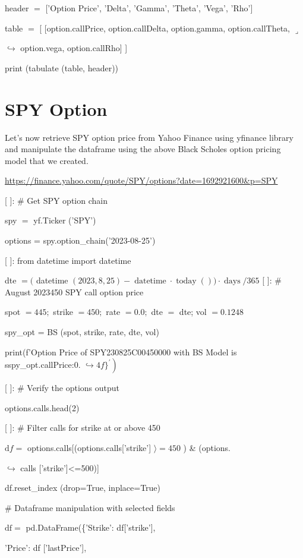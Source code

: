 \documentclass[10pt]{article}
\begin{document}
header $=$ ['Option Price', 'Delta', 'Gamma', 'Theta', 'Vega', 'Rho']

table $=$ [ [option.callPrice, option.callDelta, option.gamma, option.callTheta, $\lrcorner$

$\hookrightarrow$ option.vega, option.callRho] ]

print (tabulate (table, header))

\section*{SPY Option}
Let's now retrieve SPY option price from Yahoo Finance using yfinance library and manipulate the dataframe using the above Black Scholes option pricing model that we created.

\href{https://finance.yahoo.com/quote/SPY/options?date=1692921600&p=SPY}{https://finance.yahoo.com/quote/SPY/options?date=1692921600\&p=SPY}

[ ]: \# Get SPY option chain

spy $=$ yf.Ticker ('SPY')

options = spy.option\_chain('2023-08-25')

[ ]: from datetime import datetime

dte $=($ datetime $(2023,8,25)-\operatorname{datetime} \cdot \operatorname{today}()) \cdot \operatorname{days} / 365$ [ ]: \# August 2023450 SPY call option price

spot $=445 ;$ strike $=450 ;$ rate $=0.0 ;$ dte $=$ dte; vol $=0.1248$

spy\_opt = BS (spot, strike, rate, dte, vol)

print(f'Option Price of SPY230825C00450000 with BS Model is sspy\_opt.callPrice:0. $\left.\hookrightarrow 4 f\}^{\prime}\right)$

[ ]: \# Verify the options output

options.calls.head(2)

[ ]: \# Filter calls for strike at or above 450

$\mathrm{d} f=$ options.calls[(options.calls['strike'] $\rangle=450$ ) \& (options.

$\hookrightarrow$ calls ['strike']<=500)]

df.reset\_index (drop=True, inplace=True)

\# Dataframe manipulation with selected fields

$\mathrm{df}=$ pd.DataFrame(\{'Strike': df['strike'],

'Price': df ['lastPrice'],
\end{document}
